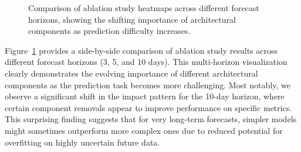 \documentclass[lettersize, journal]{IEEEtran}
\begin{document}
\begin{figure}[htbp]
    \centering
    \hfill
    \hfill
    \caption{Comparison of ablation study heatmaps across different forecast horizons, showing the shifting importance of architectural components as prediction difficulty increases.}
    \label{fig:ablation_horizon_comparison}
\end{figure}

Figure~\ref{fig:ablation_horizon_comparison} provides a side-by-side comparison of ablation study results across different forecast horizons (3, 5, and 10 days). This multi-horizon visualization clearly demonstrates the evolving importance of different architectural components as the prediction task becomes more challenging. Most notably, we observe a significant shift in the impact pattern for the 10-day horizon, where certain component removals appear to improve performance on specific metrics. This surprising finding suggests that for very long-term forecasts, simpler models might sometimes outperform more complex ones due to reduced potential for overfitting on highly uncertain future data.
\end{document}
